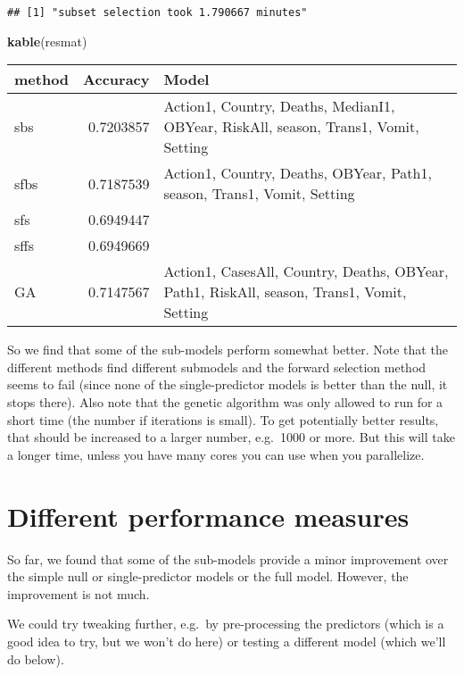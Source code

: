 \documentclass[]{article}
\newenvironment{Shaded}{\begin{snugshade}}{\end{snugshade}}
\newcommand{\KeywordTok}[1]{\textcolor[rgb]{0.13,0.29,0.53}{\textbf{#1}}}
\newcommand{\NormalTok}[1]{#1}
\begin{document}
\begin{verbatim}
## [1] "subset selection took 1.790667 minutes"
\end{verbatim}

\begin{Shaded}
\begin{Highlighting}[]
\KeywordTok{kable}\NormalTok{(resmat)}
\end{Highlighting}
\end{Shaded}

\begin{longtable}[]{@{}lrl@{}}
\toprule
method & Accuracy & Model\tabularnewline
\midrule
\endhead
sbs & 0.7203857 & Action1, Country, Deaths, MedianI1, OBYear, RiskAll,
season, Trans1, Vomit, Setting\tabularnewline
sfbs & 0.7187539 & Action1, Country, Deaths, OBYear, Path1, season,
Trans1, Vomit, Setting\tabularnewline
sfs & 0.6949447 &\tabularnewline
sffs & 0.6949669 &\tabularnewline
GA & 0.7147567 & Action1, CasesAll, Country, Deaths, OBYear, Path1,
RiskAll, season, Trans1, Vomit, Setting\tabularnewline
\bottomrule
\end{longtable}

So we find that some of the sub-models perform somewhat better. Note
that the different methods find different submodels and the forward
selection method seems to fail (since none of the single-predictor
models is better than the null, it stops there). Also note that the
genetic algorithm was only allowed to run for a short time (the number
if iterations is small). To get potentially better results, that should
be increased to a larger number, e.g.~1000 or more. But this will take a
longer time, unless you have many cores you can use when you
parallelize.

\hypertarget{different-performance-measures}{%
\section{Different performance
measures}\label{different-performance-measures}}

So far, we found that some of the sub-models provide a minor improvement
over the simple null or single-predictor models or the full model.
However, the improvement is not much.

We could try tweaking further, e.g.~by pre-processing the predictors
(which is a good idea to try, but we won't do here) or testing a
different model (which we'll do below).
\end{document}
